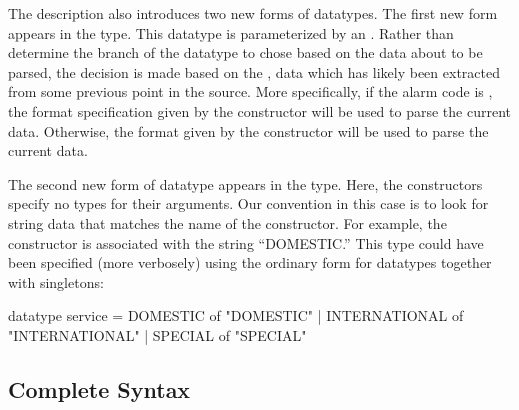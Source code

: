 
The \darkstar{} description also introduces two new forms of
datatypes.  The first new form appears in the  type.
This datatype is parameterized by an .
Rather than 
determine the branch of the datatype to chose
based on the data about to be parsed, the decision is made based on
the , data which has likely been extracted from some previous
point in the source.  More specifically, if the alarm code is
, the format specification given by the 
 constructor will be used to parse
the current data.  Otherwise, the format given by the  constructor
will be used to parse the current data.  

The second new form of datatype appears in the   type.
Here, the constructors specify no types for their arguments.  
Our convention in this case
is to look for string data that matches the name of the
constructor. For example, the constructor  
is associated with the string
``DOMESTIC.'' This type could have been specified (more verbosely)
using the ordinary form for datatypes together with singletons:
\begin{code}
datatype service =
    DOMESTIC      of "DOMESTIC"
  | INTERNATIONAL of "INTERNATIONAL"
  | SPECIAL       of "SPECIAL"
\end{code}


\subsection{Complete Syntax}


